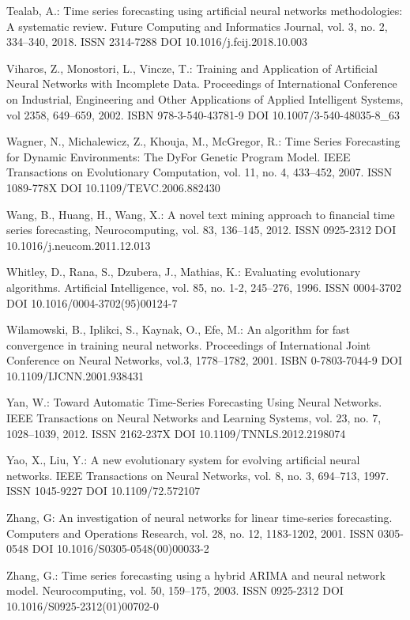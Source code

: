 \begin{thebibliography}{99.}
 Tealab, A.: Time series forecasting using artificial neural networks methodologies: A systematic review. Future Computing and Informatics Journal, vol. 3, no. 2, 334--340, 2018. ISSN 2314-7288 DOI 10.1016/j.fcij.2018.10.003

 Viharos, Z., Monostori, L., Vincze, T.: Training and Application of Artificial Neural Networks with Incomplete Data. Proceedings of International Conference on Industrial, Engineering and Other Applications of Applied Intelligent Systems, vol 2358, 649--659, 2002. ISBN 978-3-540-43781-9 DOI 10.1007/3-540-48035-8\_63

 Wagner, N., Michalewicz, Z., Khouja, M., McGregor, R.: Time Series Forecasting for Dynamic Environments: The DyFor Genetic Program Model. IEEE Transactions on Evolutionary Computation, vol. 11, no. 4, 433--452, 2007. ISSN 1089-778X DOI 10.1109/TEVC.2006.882430

 Wang, B., Huang, H., Wang, X.: A novel text mining approach to financial time series forecasting, Neurocomputing, vol. 83, 136--145, 2012. ISSN 0925-2312 DOI 10.1016/j.neucom.2011.12.013

 Whitley, D., Rana, S., Dzubera, J., Mathias, K.: Evaluating evolutionary algorithms. Artificial Intelligence, vol. 85, no. 1-2, 245--276, 1996. ISSN 0004-3702 DOI 10.1016/0004-3702(95)00124-7

 Wilamowski, B., Iplikci, S., Kaynak, O., Efe, M.: An algorithm for fast convergence in training neural networks. Proceedings of International Joint Conference on Neural Networks, vol.3, 1778--1782, 2001. ISBN 0-7803-7044-9 DOI 10.1109/IJCNN.2001.938431

 Yan, W.: Toward Automatic Time-Series Forecasting Using Neural Networks. IEEE Transactions on Neural Networks and Learning Systems, vol. 23, no. 7, 1028--1039, 2012. ISSN 2162-237X DOI 10.1109/TNNLS.2012.2198074

 Yao, X., Liu, Y.: A new evolutionary system for evolving artificial neural networks. IEEE Transactions on Neural Networks, vol. 8, no. 3, 694--713, 1997. ISSN 1045-9227 DOI 10.1109/72.572107

 Zhang, G: An investigation of neural networks for linear time-series forecasting. Computers and Operations Research, vol. 28, no. 12, 1183-1202, 2001. ISSN 0305-0548 DOI 10.1016/S0305-0548(00)00033-2

 Zhang, G.: Time series forecasting using a hybrid ARIMA and neural network model. Neurocomputing, vol. 50, 159--175, 2003. ISSN 0925-2312 DOI 10.1016/S0925-2312(01)00702-0


\end{thebibliography}
